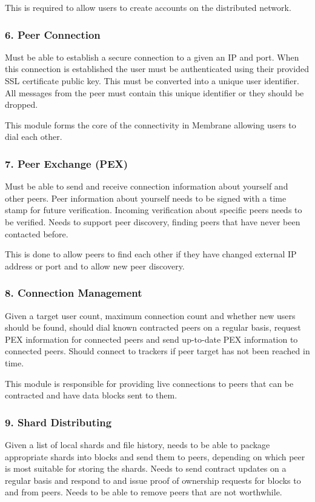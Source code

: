 \documentclass[a4paper, 11pt, twocolumn, twoside]{report}
\begin{document}
This is required to allow users to create accounts on the distributed network.

\subsubsection{6. Peer Connection}
Must be able to establish a secure connection to a given an IP and port. When this connection is established the user must be authenticated using their provided SSL certificate public key. This must be  converted into a unique user identifier. All messages from the peer must contain this unique identifier or they should be dropped.

This module forms the core of the connectivity in Membrane allowing users to dial each other.

\subsubsection{7. Peer Exchange (PEX)}
Must be able to send and receive connection information about yourself and other peers. Peer information about yourself needs to be signed with a time stamp for future verification. Incoming verification about specific peers needs to be verified. Needs to support peer discovery, finding peers that have never been contacted before.

This is done to allow peers to find each other if they have changed external IP address or port and to allow new peer discovery.

\subsubsection{8. Connection Management}
Given a target user count, maximum connection count and whether new users should be found, should dial known contracted peers on a regular basis, request PEX information for connected peers and send up-to-date PEX information to connected peers. Should connect to trackers if peer target has not been reached in time.

This module is responsible for providing live connections to peers that can be contracted and have data blocks sent to them.

\subsubsection{9. Shard Distributing}
Given a list of local shards and file history, needs to be able to package appropriate shards into blocks and send them to peers, depending on which peer is most suitable for storing the shards. Needs to send contract updates on a regular basis and respond to and issue proof of ownership requests for blocks to and from peers. Needs to be able to remove peers that are not worthwhile.
\end{document}
